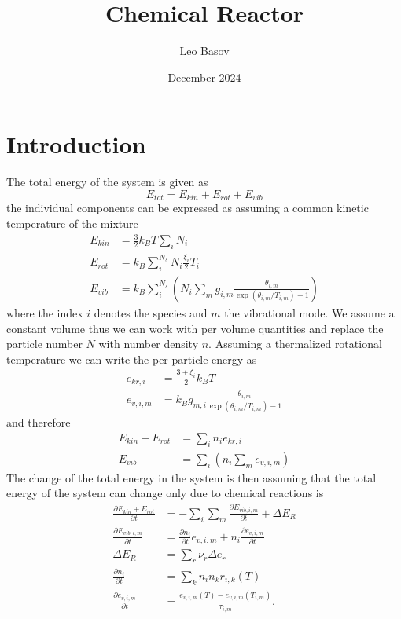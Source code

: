 \documentclass{scrreprt}
\title{Chemical Reactor}
\author{Leo Basov}
\date{December 2024}
\begin{document}
\maketitle

\chapter{Introduction}
The total energy of the system is given as
\begin{equation}
	E_{tot} = E_{kin} + E_{rot} + E_{vib}
\end{equation}
the individual components can be expressed as assuming a common kinetic temperature of the mixture
\begin{align}
	E_{kin} &= \frac{3}{2} k_B T \sum_i N_i\\
	E_{rot} &= k_B \sum_i^{N_s} N_i \frac{\xi_i}{2} T_i\\
	E_{vib} &= k_B \sum_i^{N_s} \left( N_i \sum_m g_{i, m} \frac{\theta_{i, m}}{\exp(\theta_{i, m} / T_{i, m}) - 1} \right)
\end{align}
where the index $i$ denotes the species and $m$ the vibrational mode.
We assume a constant volume thus we can work with per volume quantities and replace the particle number $N$ with number density $n$.
Assuming a thermalized rotational temperature we can write the per particle energy as
\begin{align}
	e_{kr, i} &= \frac{3 + \xi_i}{2} k_B T\\
	e_{v, i, m} &= k_B g_{m, i} \frac{\theta_{i, m}}{\exp(\theta_{i, m} / T_{i, m}) - 1}
\end{align}
and therefore
\begin{align}
	E_{kin} + E_{rot} &= \sum_i n_i e_{kr, i}\\
	E_{vib} &= \sum_i \left( n_i \sum_m e_{v, i, m}\right)
\end{align}
The change of the total energy in the system is then assuming that the total energy of the system can change only due to chemical reactions is
\begin{align}
	\frac{\partial E_{kin} + E_{rot}}{\partial t} &= -\sum_i \sum_m \frac{\partial E_{vib, i, m}}{\partial t} + \Delta E_R\\
	\frac{\partial E_{vib, i, m}}{\partial t} &= \frac{\partial n_i}{\partial t} e_{v, i, m} + n_i  \frac{\partial e_{v, i, m}}{\partial t}\\
	\Delta E_R &= \sum_r \nu_r \Delta e_r\\
	\frac{\partial n_i}{\partial t} &= \sum_k n_i n_k r_{i, k}(T)\\
	\frac{\partial e_{v, i, m}}{\partial t} &= \frac{e_{v, i, m}(T) - e_{v, i, m}(T_{i,m})}{\tau_{i, m}}.
\end{align}
\end{document}
